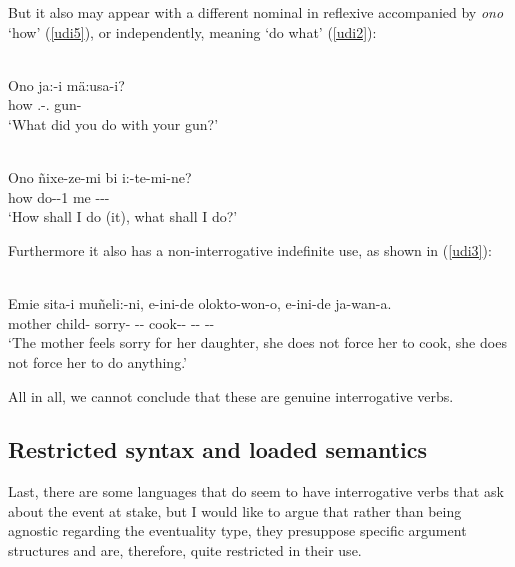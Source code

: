 \documentclass[output=paper]{langsci/langscibook}
\begin{document}
But it also may appear with a different nominal in reflexive accompanied by
\emph{ono} `how' (\ref{udi5}), or independently, meaning `do what'
(\ref{udi2}):

\begin{exe}
\ex \label{udi5} \\
\gll Ono ja:-i m\"a:usa-i?\\
how \Prov.\Pst-\Ssg.\glossF{} gun-\Refl{}\\
\glt `What did you do with your gun?'

\ex \label{udi2} \\
\gll Ono \~nixe-ze-mi bi i:-te-mi-ne?\\
how do-\Sbjv{}-1\Sg{} me \Prov{}-\Perm{}-\Fsg{}-\Cntr{}\\
\glt `How shall I do (it), what shall I do?'
\end{exe}

Furthermore it also has a non-interrogative indefinite use, as shown in
(\ref{udi3}):

\begin{exe}
\ex \label{udi3} \\
\gll Emi\ng e sita-i mu\~neli:-ni, e-ini-de olokto-won-o, e-ini-de ja-wan-a.\\
mother child-\Fsg{} sorry-\Tsg{} \Neg{}-\Tsg-\Foc{} cook-\Caus{}-\Ep{}
\Neg{}-\Tsg{}-\Foc{} \Prov-\Caus-\Ep{}\\
\glt `The mother feels sorry for her daughter, she does not force her to cook, she does not force her to do anything.'
\end{exe}

All in all, we cannot conclude that these are genuine interrogative verbs.

\subsection{Restricted syntax and loaded semantics}
\label{loaded}
Last, there are some languages that do seem to have interrogative verbs that
ask about the event at stake, but I would like to argue that rather than being
agnostic regarding the eventuality type, they presuppose specific argument
structures and are, therefore, quite restricted in their use.
\end{document}
